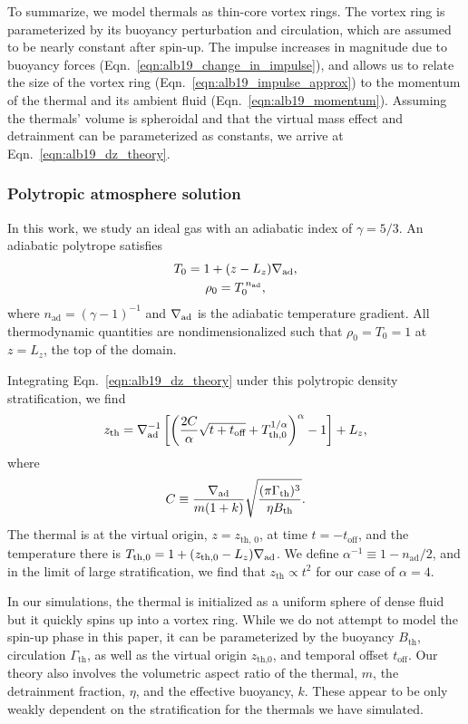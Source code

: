 To summarize, we model thermals as thin-core vortex rings.
The vortex ring is parameterized by its buoyancy perturbation and circulation, which are assumed to be nearly constant after spin-up.
The impulse increases in magnitude due to buoyancy forces (Eqn.~\ref{eqn:alb19_change_in_impulse}), and allows us to relate the size of the vortex ring (Eqn.~\ref{eqn:alb19_impulse_approx}) to the momentum of the thermal and its ambient fluid (Eqn.~\ref{eqn:alb19_momentum}).
Assuming the thermals' volume is spheroidal and that the virtual mass effect and detrainment can be parameterized as constants, we arrive at Eqn.~\ref{eqn:alb19_dz_theory}.

\subsubsection{Polytropic atmosphere solution}
In this work, we study an ideal gas with an adiabatic index of $\gamma = 5/3$.
An adiabatic polytrope satisfies
\begin{gather}\label{eqn:alb19_T0}
T_0 = 1 + (z - L_z)\nabla_{\text{ad}}, \\
\rho_0 = T_0^{\,n_{\text{ad}}},
\label{eqn:alb19_alb19_polytrope}
\end{gather}
where $n_{\text{ad}} = (\gamma-1)^{-1}$ and $\nabla_{\text{ad}}$ is the adiabatic temperature gradient.
All thermodynamic quantities are nondimensionalized such that $\rho_0 = T_0 = 1$ at $z = L_z$, the top of the domain.

Integrating Eqn.~\ref{eqn:alb19_dz_theory} under this polytropic density stratification, we find
\begin{equation}
z_{\text{th}} = \nabla_{\text{ad}}^{-1}\left[\left(\frac{2C}{ \alpha } \sqrt{t + t_{\text{off}}} + T_{\text{th},0}^{1/\alpha}  \right)^{\alpha} - 1\right] + L_z,
\label{eqn:alb19_theory_z}
\end{equation}
where 
$$
C \equiv \frac{\nabla_{\text{ad}}}{m(1 + k)} \sqrt{\frac{(\pi\Gamma_{\text{th}})^3}{\eta B_{\text{th}}}}.
$$ 
The thermal is at the virtual origin, $z=z_{\text{th, 0}}$, at time $t=-t_{\text{off}}$, and the temperature there is $T_{\text{th},0} = 1 + (z_{\text{th},0} - L_z)\nabla_{\text{ad}}$.
We define $\alpha^{-1} \equiv 1 - n_{\text{ad}}/2$, and in the limit of large stratification, we find that $z_{\text{th}} \propto t^2$ for our case of $\alpha = 4$. 

In our simulations, the thermal is initialized as a uniform sphere of dense fluid but it quickly spins up into a vortex ring. 
While we do not attempt to model the spin-up phase in this paper, it can be parameterized by the buoyancy $B_{\text{th}}$, circulation $\Gamma_{\text{th}}$, as well as the virtual origin $z_{\text{th,0}}$, and temporal offset $t_{\text{off}}$. 
Our theory also involves the volumetric aspect ratio of the thermal, $m$, the detrainment fraction, $\eta$, and the effective buoyancy, $k$. 
These appear to be only weakly dependent on the stratification for the thermals we have simulated.


